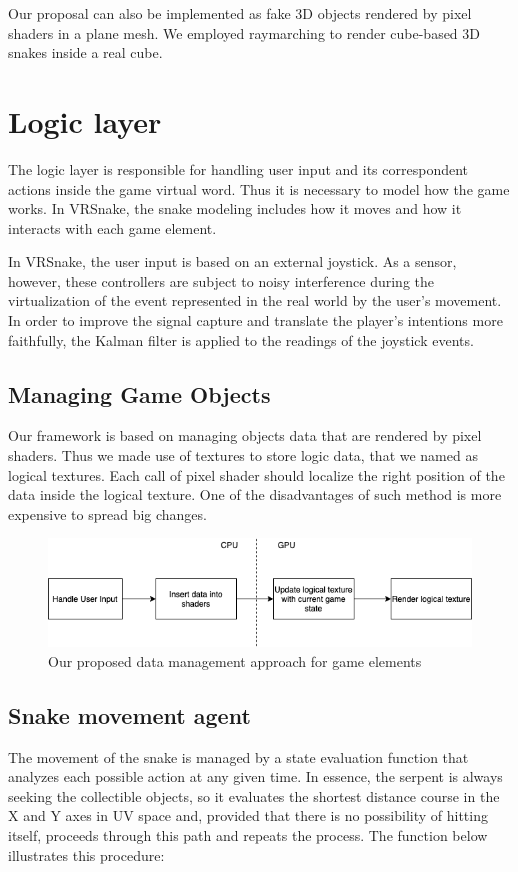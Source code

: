 \documentclass[runningheads]{llncs}
\begin{document}
Our proposal can also be implemented as fake 3D objects rendered by pixel shaders in a plane mesh. We employed raymarching to render cube-based 3D snakes inside a real cube.

\section{Logic layer}

The logic layer is responsible for handling user input and its correspondent actions inside the game virtual word. Thus it is necessary to model how the game works. In VRSnake, the snake modeling includes how it moves and how it interacts with each game element.

In VRSnake, the user input is based on an external joystick. As a sensor, however, these controllers are subject to noisy interference during the virtualization of the event represented in the real world by the user's movement. In order to improve the signal capture and translate the player's intentions more faithfully, the Kalman filter is applied to the readings of the joystick events.

\subsection{Managing Game Objects}

Our framework is based on managing objects data that are rendered by pixel shaders. Thus  we made use of textures to store logic data, that we named as logical textures. Each call of pixel shader should localize the right position of the data inside the logical texture. One of the disadvantages of such method is more expensive to spread big changes.

\begin{figure}[h]
\centering
\includegraphics[width=\textwidth]{hci2020-paper/images/VRSnake_GameObjectData_Management.png}
\caption{Our proposed data management approach for game elements}
\label{fig:VR_GameObjectData_Management}
\end{figure}

\subsection{Snake movement agent} \label{sec:agent}
The movement of the snake is managed by a state evaluation function that analyzes each possible action at any given time. In essence, the serpent is always seeking  the collectible objects, so it evaluates the shortest distance course in the X and Y axes in UV space and, provided that there is no possibility of hitting itself, proceeds through this path and repeats the process. The function below illustrates this procedure:
\end{document}
